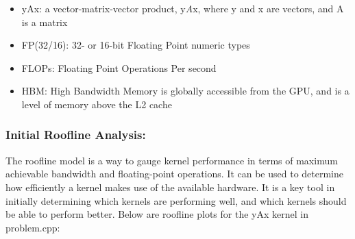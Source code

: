 \documentclass[
]{article}
\begin{document}
\begin{itemize}
     
\item yAx: a vector-matrix-vector product, y\emph{A}x, where y and x are
vectors, and A is a matrix

\item FP(32/16): 32- or 16-bit Floating Point numeric types

\item FLOPs: Floating Point Operations Per second

\item HBM: High Bandwidth Memory is globally accessible from the GPU, and is a
level of memory above the L2 cache

\end{itemize}

\hypertarget{initial-roofline-analysis}{%
\subsubsection{Initial Roofline
Analysis:}\label{initial-roofline-analysis}}

The roofline model is a way to gauge kernel performance in terms of
maximum achievable bandwidth and floating-point operations. It can be
used to determine how efficiently a kernel makes use of the available
hardware. It is a key tool in initially determining which kernels are
performing well, and which kernels should be able to perform better.
Below are roofline plots for the yAx kernel in problem.cpp:
\end{document}
